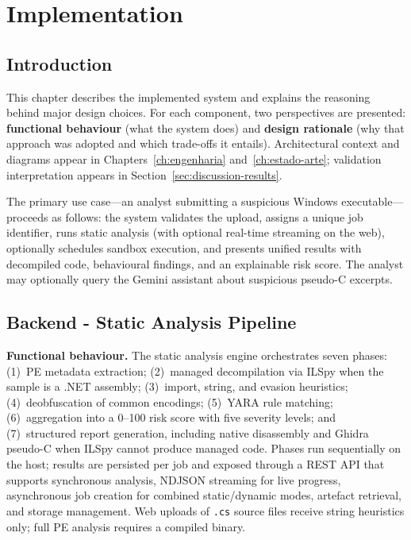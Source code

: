 \chapter{Implementation}
\label{ch:implementacao}

\section{Introduction}

This chapter describes the implemented system and explains the reasoning behind major design
choices. For each component, two perspectives are presented: \textbf{functional behaviour} (what
the system does) and \textbf{design rationale} (why that approach was adopted and which
trade-offs it entails). Architectural context and diagrams appear in
Chapters~\ref{ch:engenharia} and~\ref{ch:estado-arte}; validation interpretation appears in
Section~\ref{sec:discussion-results}.

The primary use case---an analyst submitting a suspicious Windows executable---proceeds as follows:
the system validates the upload, assigns a unique job identifier, runs static analysis (with optional
real-time streaming on the web), optionally schedules sandbox execution, and presents unified results
with decompiled code, behavioural findings, and an explainable risk score. The analyst may
optionally query the Gemini assistant about suspicious pseudo-C excerpts.

\section{Backend - Static Analysis Pipeline}

\textbf{Functional behaviour.}
The static analysis engine orchestrates seven phases: (1)~PE metadata extraction;
(2)~managed decompilation via ILSpy when the sample is a .NET assembly; (3)~import, string, and
evasion heuristics; (4)~deobfuscation of common encodings; (5)~YARA rule matching;
(6)~aggregation into a 0--100 risk score with five severity levels; and (7)~structured report
generation, including native disassembly and Ghidra pseudo-C when ILSpy cannot produce managed
code. Phases run sequentially on the host; results are persisted per job and exposed through a
REST API that supports synchronous analysis, NDJSON streaming for live progress, asynchronous
job creation for combined static/dynamic modes, artefact retrieval, and storage management. Web
uploads of \texttt{.cs} source files receive string heuristics only; full PE analysis requires a
compiled binary.

